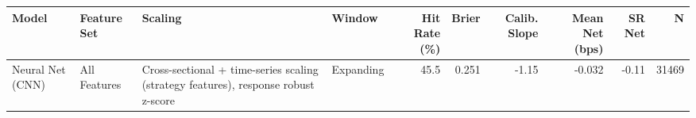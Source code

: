 \begin{tabular}{llllrrrrrr}
\toprule
Model & Feature Set & Scaling & Window & Hit Rate (\%) & Brier & Calib. Slope & Mean Net (bps) & SR Net & N \\
\midrule
Neural Net (CNN) & All Features & Cross-sectional + time-series scaling (strategy features), response robust z-score & Expanding & 45.5 & 0.251 & -1.15 & -0.032 & -0.11 & 31469 \\
\bottomrule
\end{tabular}
